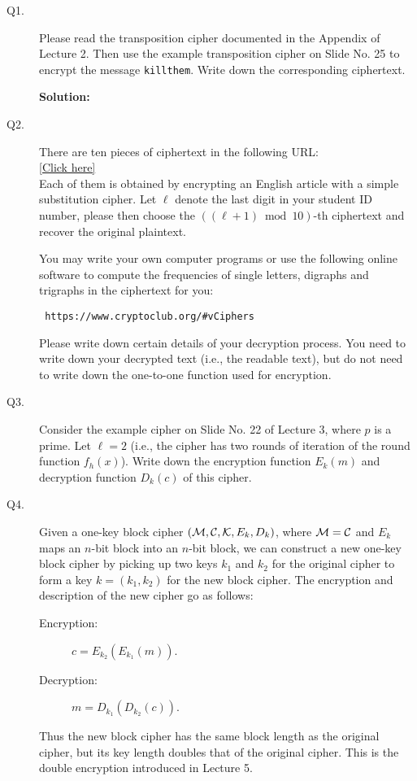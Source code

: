 \documentclass[11pt,epsfig]{article}
\newcommand{\cM}{{\cal M}}
\newcommand{\cC}{{\cal C}}
\newcommand{\cK}{{\cal K}}
\begin{document}
\begin{description}


\item[Q1.] 
Please read the transposition  cipher documented in the Appendix of Lecture 2. 
Then use the example transposition cipher on Slide No. 25 to encrypt the message 
\texttt{killthem}. Write down the corresponding ciphertext.  \hfill {} 

\textbf{Solution:}



\item[Q2.] 
There are ten pieces of ciphertext in the following URL:  \\
 \href{https://home.cse.ust.hk/faculty/cding/COMP5631/c685-5.html}{[Click here]} \\
 Each of them is obtained by encrypting an English article with a simple substitution 
 cipher. Let $\ell$ denote the last digit in your student ID number, please then choose the 
 $((\ell +1) \bmod{10})$-th ciphertext and recover the original plaintext. 
 
 
 You may write your own computer programs or use the following online software to compute the frequencies of single 
 letters, digraphs and trigraphs in the ciphertext for you: 
 \begin{verbatim} 
 https://www.cryptoclub.org/#vCiphers
 \end{verbatim} 
 Please write down certain details of your decryption process. You need to write down your decrypted text (i.e., 
 the readable text), but do not need to write down the one-to-one function used for encryption.    
\hfill {}


\item[Q3.]
Consider the example cipher on Slide No. 22 of Lecture 3, where $p$ is a prime.  Let 
$\ell =2$ (i.e., the cipher has two rounds of iteration of the 
round function $f_h(x)$).  Write down the encryption function $E_k(m)$ and decryption function $D_k(c)$ of this cipher.     \hfill {} 


\item[Q4.] 
Given a one-key block cipher $(\cM, \cC, \cK, E_k, D_{k})$, where $\cM=\cC$ and $E_k$ 
maps an $n$-bit block into an $n$-bit block, we can 
construct a new one-key block cipher by picking up two keys $k_1$ and $k_2$ for the 
original cipher to form a key $k=(k_1,k_2)$ for the new block cipher. The 
encryption and description of the new cipher go as follows: 
\begin{description}
\item[Encryption:] $c=E_{k_2}(E_{k_1}(m))$. 
\item[Decryption:] $m=D_{k_1}(D_{k_2}(c))$.  
\end{description}
Thus the new block cipher has the same block length as the original cipher, 
but its key length doubles that of the original cipher. This is the double 
encryption introduced in Lecture 5. 


\end{description}
\end{document}
